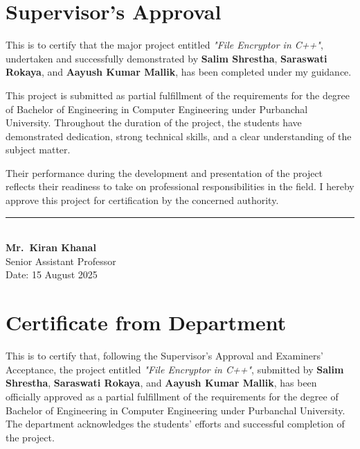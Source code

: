 \documentclass[12pt, a4paper]{report}
\begin{document}
\newpage

\chapter*{Supervisor's Approval}

This is to certify that the major project entitled \textit{"File Encryptor in C++"}, undertaken
and successfully demonstrated by \textbf{Salim Shrestha}, \textbf{Saraswati Rokaya}, and
\textbf{Aayush Kumar Mallik}, has been completed under my guidance.

This project is submitted as partial fulfillment of the requirements for the degree of Bachelor
of Engineering in Computer Engineering under Purbanchal University. Throughout the
duration of the project, the students have demonstrated dedication, strong technical skills,
and a clear understanding of the subject matter.

Their performance during the development and presentation of the project reflects their
readiness to take on professional responsibilities in the field. I hereby approve this project
for certification by the concerned authority.

\vspace{2cm}

\noindent\rule{5cm}{0.4pt}\\[0.2cm]
\textbf{Mr.~Kiran Khanal}\\
Senior Assistant Professor\\[0.4cm]
Date: 15 August 2025

\newpage

\chapter*{Certificate from Department}

This is to certify that, following the Supervisor's Approval and Examiners' Acceptance, the
project entitled \textit{"File Encryptor in C++"}, submitted by \textbf{Salim Shrestha},
\textbf{Saraswati Rokaya}, and \textbf{Aayush Kumar Mallik}, has been officially approved as
a partial fulfillment of the requirements for the degree of Bachelor of Engineering in Computer
Engineering under Purbanchal University. The department acknowledges the students' efforts
and successful completion of the project.
\end{document}

